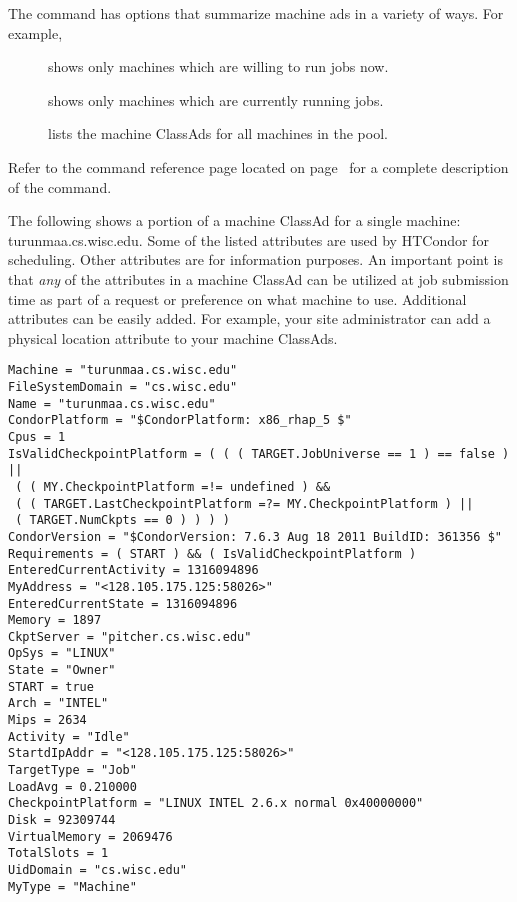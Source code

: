 The  command has options that summarize machine ads 
in a variety of ways.
For example,
\begin{description}
\item[] shows only machines which are
willing to run jobs now. 
\item[] shows only machines
which are currently running jobs.  
\item[] lists the machine ClassAds for all machines
in the pool.
\end{description}

Refer to the  command 
reference page located on page~\pageref{man-condor-status}
for a complete description of the  command.

The following shows a portion of a machine ClassAd
for a single machine: turunmaa.cs.wisc.edu. Some of the listed
attributes are used by
HTCondor for scheduling. Other attributes are for information purposes.
An important point is that \emph{any} of the attributes in a
machine ClassAd can be utilized at job submission time as part of a request
or preference on what machine to use. Additional attributes
can be easily added. For example, your site administrator can
add a physical location attribute to your machine ClassAds.


\footnotesize
\begin{verbatim}
Machine = "turunmaa.cs.wisc.edu"
FileSystemDomain = "cs.wisc.edu"
Name = "turunmaa.cs.wisc.edu"
CondorPlatform = "$CondorPlatform: x86_rhap_5 $"
Cpus = 1
IsValidCheckpointPlatform = ( ( ( TARGET.JobUniverse == 1 ) == false ) || 
 ( ( MY.CheckpointPlatform =!= undefined ) && 
 ( ( TARGET.LastCheckpointPlatform =?= MY.CheckpointPlatform ) || 
 ( TARGET.NumCkpts == 0 ) ) ) )
CondorVersion = "$CondorVersion: 7.6.3 Aug 18 2011 BuildID: 361356 $"
Requirements = ( START ) && ( IsValidCheckpointPlatform )
EnteredCurrentActivity = 1316094896
MyAddress = "<128.105.175.125:58026>"
EnteredCurrentState = 1316094896
Memory = 1897
CkptServer = "pitcher.cs.wisc.edu"
OpSys = "LINUX"
State = "Owner"
START = true
Arch = "INTEL"
Mips = 2634
Activity = "Idle"
StartdIpAddr = "<128.105.175.125:58026>"
TargetType = "Job"
LoadAvg = 0.210000
CheckpointPlatform = "LINUX INTEL 2.6.x normal 0x40000000"
Disk = 92309744
VirtualMemory = 2069476
TotalSlots = 1
UidDomain = "cs.wisc.edu"
MyType = "Machine"
\end{verbatim}
\normalsize


